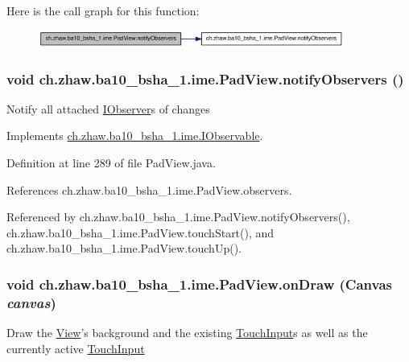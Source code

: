 Here is the call graph for this function:\nopagebreak
\begin{figure}[H]
\begin{center}
\leavevmode
\includegraphics[width=284pt]{classch_1_1zhaw_1_1ba10__bsha__1_1_1ime_1_1PadView_aa3a0e6aedfc80225bf47ce3cce17db27_cgraph}
\end{center}
\end{figure}
\hypertarget{classch_1_1zhaw_1_1ba10__bsha__1_1_1ime_1_1PadView_a1516c15d8011caccf368c5d709f19e01}{
\subsubsection[{notifyObservers}]{\setlength{\rightskip}{0pt plus 5cm}void ch.zhaw.ba10\_\-bsha\_\-1.ime.PadView.notifyObservers ()}}
\label{classch_1_1zhaw_1_1ba10__bsha__1_1_1ime_1_1PadView_a1516c15d8011caccf368c5d709f19e01}
Notify all attached \hyperlink{interfacech_1_1zhaw_1_1ba10__bsha__1_1_1ime_1_1IObserver}{IObserver}s of changes 

Implements \hyperlink{interfacech_1_1zhaw_1_1ba10__bsha__1_1_1ime_1_1IObservable_ade6befac243ff61d162ba09d6ff2e31d}{ch.zhaw.ba10\_\-bsha\_\-1.ime.IObservable}.

Definition at line 289 of file PadView.java.

References ch.zhaw.ba10\_\-bsha\_\-1.ime.PadView.observers.

Referenced by ch.zhaw.ba10\_\-bsha\_\-1.ime.PadView.notifyObservers(), ch.zhaw.ba10\_\-bsha\_\-1.ime.PadView.touchStart(), and ch.zhaw.ba10\_\-bsha\_\-1.ime.PadView.touchUp().\hypertarget{classch_1_1zhaw_1_1ba10__bsha__1_1_1ime_1_1PadView_ac3129d73ee224efd3cd031971c810818}{
\subsubsection[{onDraw}]{\setlength{\rightskip}{0pt plus 5cm}void ch.zhaw.ba10\_\-bsha\_\-1.ime.PadView.onDraw (Canvas {\em canvas})}}
\label{classch_1_1zhaw_1_1ba10__bsha__1_1_1ime_1_1PadView_ac3129d73ee224efd3cd031971c810818}
Draw the \hyperlink{}{View}'s background and the existing \hyperlink{classch_1_1zhaw_1_1ba10__bsha__1_1_1ime_1_1TouchInput}{TouchInput}s as well as the currently active \hyperlink{classch_1_1zhaw_1_1ba10__bsha__1_1_1ime_1_1TouchInput}{TouchInput} 

